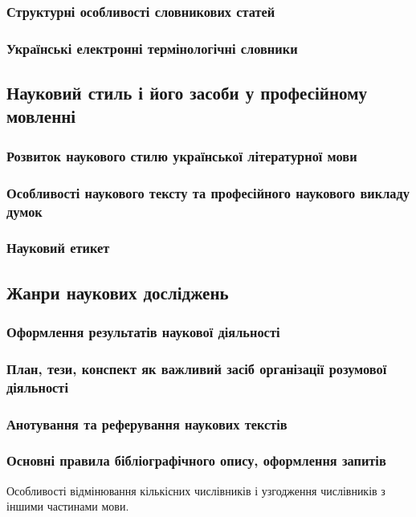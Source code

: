 \documentclass[a4paper,10pt,notitlepage,pdftex,headsepline]{scrartcl}
\begin{document}
      \subsubsection{Структурні особливості словникових статей}
      \subsubsection{Українські електронні термінологічні словники}

  \subsection{Науковий стиль і його засоби у професійному мовленні}
    \subsubsection{Розвиток наукового стилю української літературної мови}
    \subsubsection{Особливості наукового тексту та професійного наукового
    викладу думок}
    \subsubsection{Науковий етикет}
  \subsection{Жанри наукових досліджень}
    \subsubsection{Оформлення результатів наукової діяльності}
    \subsubsection{План, тези, конспект як важливий засіб організації
    розумової діяльності}
    \subsubsection{Анотування та реферування наукових текстів}
    \subsubsection{Основні правила бібліографічного опису, оформлення запитів}


    Особливості відмінювання кількісних числівників і узгодження числівників з
    іншими частинами мови.
\end{document}

